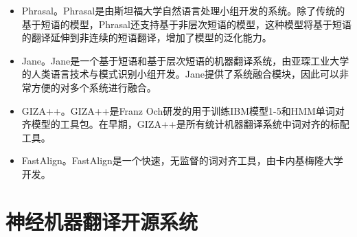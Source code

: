 \begin{appendices}
\begin{itemize}
\vspace{0.5em}
\item Phrasal。Phrasal是由斯坦福大学自然语言处理小组开发的系统。除了传统的基于短语的模型，Phrasal还支持基于非层次短语的模型，这种模型将基于短语的翻译延伸到非连续的短语翻译，增加了模型的泛化能力。
\vspace{0.5em}
\item Jane。Jane是一个基于短语和基于层次短语的机器翻译系统，由亚琛工业大学的人类语言技术与模式识别小组开发。Jane提供了系统融合模块，因此可以非常方便的对多个系统进行融合。
\vspace{0.5em}
\item GIZA++。GIZA++是Franz Och研发的用于训练IBM模型1-5和HMM单词对齐模型的工具包。在早期，GIZA++是所有统计机器翻译系统中词对齐的标配工具。
\vspace{0.5em}
\item FastAlign。FastAlign是一个快速，无监督的词对齐工具，由卡内基梅隆大学开发。
\vspace{0.5em}
\end{itemize}

\section{神经机器翻译开源系统}


\end{appendices}
